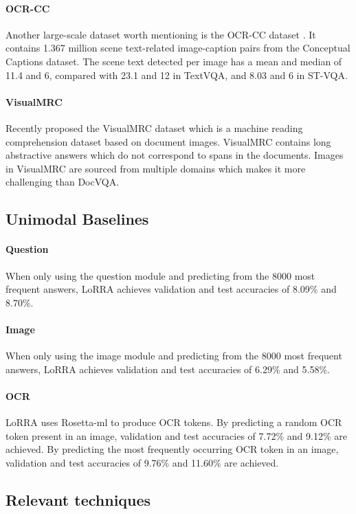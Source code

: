 \documentclass[11pt,a4paper]{article}
\begin{document}
\paragraph{OCR-CC} Another large-scale dataset worth mentioning is the OCR-CC dataset \cite{yang2021tap}. It contains 1.367 million scene text-related image-caption pairs from the Conceptual Captions dataset. The scene text detected per image has a mean and median of 11.4 and 6, compared with 23.1 and 12 in TextVQA, and 8.03 and 6 in ST-VQA.

\paragraph{VisualMRC} Recently \citet{tanaka2021visualmrc} proposed the VisualMRC dataset which is a machine reading comprehension dataset based on document images. VisualMRC contains long abstractive answers which do not correspond to spans in the documents. Images in VisualMRC are sourced from multiple domains which makes it more challenging than DocVQA.


\subsection{Unimodal Baselines}
\paragraph{Question} When only using the question module and predicting from the 8000 most frequent answers, LoRRA \cite{Singh_2019_CVPR} achieves validation and test accuracies of 8.09\% and 8.70\%. 

\paragraph{Image} When only using the image module and predicting from the 8000 most frequent answers, LoRRA achieves validation and test accuracies of 6.29\% and 5.58\%. 

\paragraph{OCR} LoRRA uses Rosetta-ml to produce OCR tokens. By predicting a random OCR token present in an image, validation and test accuracies of 7.72\% and 9.12\% are achieved. By predicting the most frequently occurring OCR token in an image, validation and test accuracies of 9.76\% and 11.60\% are achieved.


\subsection{Relevant techniques}
\end{document}
